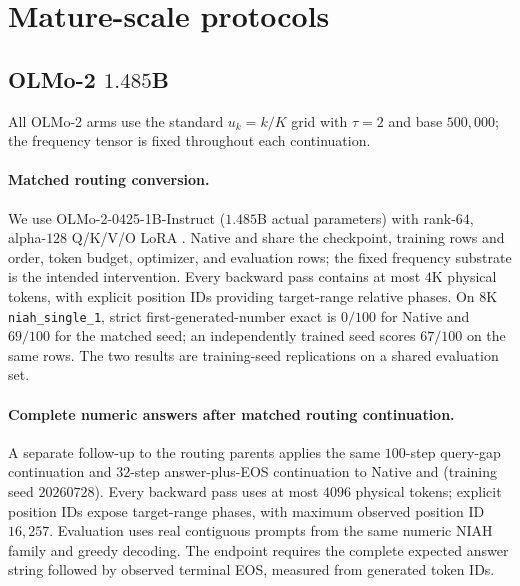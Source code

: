 \section{Mature-scale protocols}
\label{sec:mature-details}

\subsection{OLMo-2 \texorpdfstring{$1.485$B}{1.485B}}
\label{sec:olmo2-1b}

All OLMo-2 \evq{} arms use the standard $u_k{=}k/K$ grid with $\tau{=}2$ and
base $500{,}000$; the frequency tensor is fixed throughout each continuation.

\paragraph{Matched routing conversion.}
We use OLMo-2-0425-1B-Instruct \citep{olmo2furious} ($1.485$B actual
parameters) with rank-$64$, alpha-$128$ Q/K/V/O LoRA \citep{hu2022lora}.
Native and \evq{} share the checkpoint, training rows and order, token budget,
optimizer, and evaluation rows; the fixed frequency substrate is the intended
intervention. Every backward pass contains at most $4$K physical tokens,
with explicit position IDs providing target-range relative phases. On $8$K
\texttt{niah\_single\_1}, strict first-generated-number exact is $0/100$
for Native and $69/100$ for the matched \evq{} seed; an independently trained
\evq{} seed scores $67/100$ on the same rows. The two \evq{} results are
training-seed replications on a shared evaluation set.

\paragraph{Complete numeric answers after matched routing continuation.}
A separate follow-up to the routing parents applies the same $100$-step
query-gap continuation and $32$-step answer-plus-EOS continuation to Native
and \evq{} (training seed $20260728$). Every backward pass uses at most
$4096$ physical tokens; explicit position IDs expose target-range phases,
with maximum observed position ID $16{,}257$. Evaluation uses real contiguous
prompts from the same numeric NIAH family and greedy decoding.
The endpoint requires the complete expected answer string followed by
observed terminal EOS, measured from generated token IDs.


